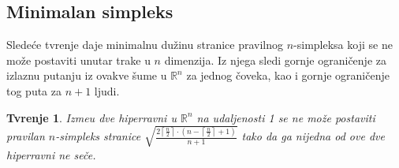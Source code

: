 \documentclass[11pt,letter]{article}
\newtheorem{tvr}[teo]{\bf Tvr\dj enje}
\begin{document}
\smallskip
\subsection[Minimalan simpleks]{Minimalan simpleks}
\bigskip

\indent Slede\' ce tvr\dj enje daje minimalnu du\v zinu stranice pravilnog $n$-simpleksa koji se ne mo\v ze postaviti unutar trake u $n$ dimenzija. Iz njega sledi gornje ograni\v cenje za izlaznu putanju iz ovakve \v sume u $\mathbb{R}^n$ za jednog \v coveka, kao i gornje ograni\v cenje tog puta za $n+1$ ljudi. 
\smallskip

\begin{tvr} Izme\dj u dve hiperravni u $\mathbb{R}^n$ na udaljenosti 1 se ne mo\v ze postaviti pravilan $n$-simpleks stranice $\sqrt{\frac{2\left\lceil \frac{n}{2}\right\rceil\cdot \left( n-\left\lceil\frac{n}{2}\right\rceil+1\right)}{n+1}}$ tako da ga nijedna od ove dve hiperravni ne se\v ce.
\end{tvr}
\end{document}
